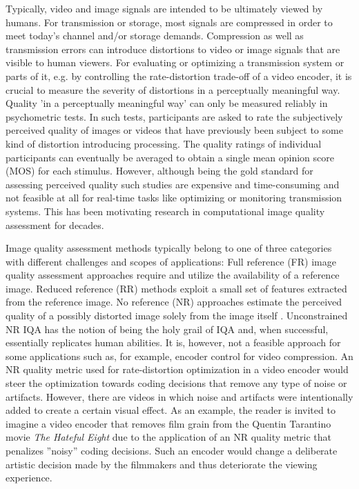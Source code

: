 \documentclass[11pt,a4paper]{article}
\begin{document}
Typically, video and image signals are intended to be ultimately viewed by
humans. For transmission or storage, most signals are compressed in
order to meet today's channel and/or storage demands. Compression as well 
as transmission errors can introduce distortions to video or image signals that are visible to human viewers. 
For evaluating or optimizing a transmission system or parts of it, e.g. by
controlling the rate-distortion trade-off of a video encoder, it is crucial to
measure the severity of distortions in a perceptually meaningful way.
Quality 'in a perceptually meaningful way' can only be measured reliably in
psychometric tests. In such tests, participants are asked to
rate the subjectively perceived quality of images
or videos that have previously been subject to some kind of distortion introducing processing. The quality ratings of individual participants can eventually be averaged 
to obtain a single mean opinion score (MOS) for each stimulus. 
However, although being the gold standard for assessing perceived quality such studies are expensive and time-consuming and not feasible at all for real-time 
tasks like optimizing or monitoring transmission systems. This has
been motivating research in computational image quality assessment for decades.

Image quality assessment methods typically belong to one of three categories
with different challenges and scopes of applications: Full reference (FR)
image quality assessment approaches require and utilize the availability of a reference image. Reduced reference (RR) methods exploit a small set of features extracted from
the reference image. No reference (NR) approaches estimate the perceived quality of a possibly distorted image
solely from the image itself \cite{Lin2011}.
Unconstrained NR IQA has the notion of being the holy grail of IQA and, when successful,
essentially replicates human abilities. 
It is, however, not a feasible approach for some applications such as, for example, encoder control for video compression. An NR quality metric used for rate-distortion optimization in a video encoder would steer the optimization towards coding decisions that remove any type of noise or artifacts. However, there are videos in which noise and artifacts were intentionally added to create a certain visual effect. As an example, the reader is invited to imagine a video encoder that removes film grain from the Quentin Tarantino movie \textit{The Hateful Eight} due to the application of an NR quality metric that penalizes ''noisy'' coding decisions. Such an encoder would change a deliberate artistic decision made by the filmmakers and thus deteriorate the viewing experience.
\end{document}
